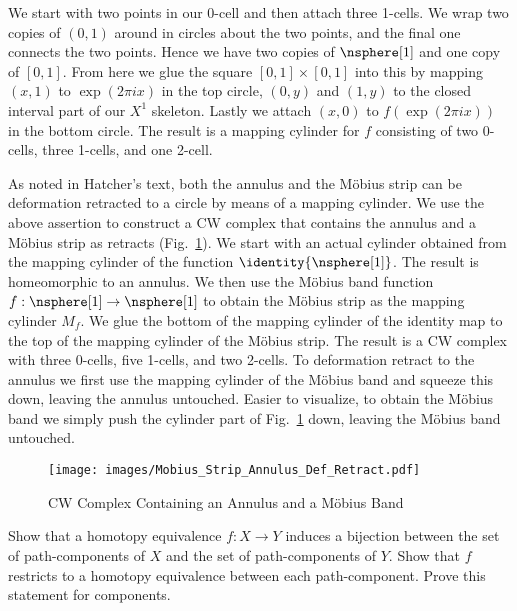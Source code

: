     \begin{solution}
        We start with two points in our 0-cell and then attach three 1-cells.
        We wrap two copies of $(0,1)$ around in circles about the two points,
        and the final one connects the two points. Hence we have two copies of
        $\nsphere[1]$ and one copy of $[0,1]$. From here we glue the square
        $[0,1]\times[0,1]$ into this by mapping $(x,1)$ to $\exp(2\pi{i}x)$ in
        the top circle, $(0,y)$ and $(1,y)$ to the closed interval part of our
        $X^{1}$ skeleton. Lastly we attach $(x,0)$ to $f(\exp(2\pi{i}x))$ in
        the bottom circle. The result is a mapping cylinder for $f$ consisting
        of two 0-cells, three 1-cells, and one 2-cell.
        \par\hfill\par
        As noted in Hatcher's text, both the annulus and the M\"{o}bius strip
        can be deformation retracted to a circle by means of a mapping cylinder.
        We use the above assertion to construct a CW complex that contains the
        annulus and a M\"{o}bius strip as retracts
        (Fig.~\ref{fig:CW_Comp_Annulus_Mobius}). We start with an actual
        cylinder obtained from the mapping cylinder of the function
        $\identity{\nsphere[1]}$. The result is homeomorphic to an annulus. We
        then use the M\"{o}bius band function
        $f:\nsphere[1]\rightarrow\nsphere[1]$ to obtain the M\"{o}bius strip as
        the mapping cylinder $M_{f}$. We glue the bottom of the mapping cylinder
        of the identity map to the top of the mapping cylinder of the M\"{o}bius
        strip. The result is a CW complex with three 0-cells, five 1-cells, and
        two 2-cells. To deformation retract to the annulus we first use the
        mapping cylinder of the M\"{o}bius band and squeeze this down, leaving
        the annulus untouched. Easier to visualize, to obtain the M\"{o}bius
        band we simply push the cylinder part of
        Fig.~\ref{fig:CW_Comp_Annulus_Mobius} down, leaving the M\"{o}bius band
        untouched.
    \end{solution}
    \begin{figure}[H]
        \centering
        \captionsetup{type=figure}
        \texttt{[image: images/Mobius\_Strip\_Annulus\_Def\_Retract.pdf]}
        \caption{CW Complex Containing an Annulus and a M\"{o}bius Band}
        \label{fig:CW_Comp_Annulus_Mobius}
    \end{figure}
    \begin{problem}
        Show that a homotopy equivalence $f:X\rightarrow{Y}$ induces a bijection
        between the set of path-components of $X$ and the set of path-components
        of $Y$. Show that $f$ restricts to a homotopy equivalence between each
        path-component. Prove this statement for components.
    \end{problem}

